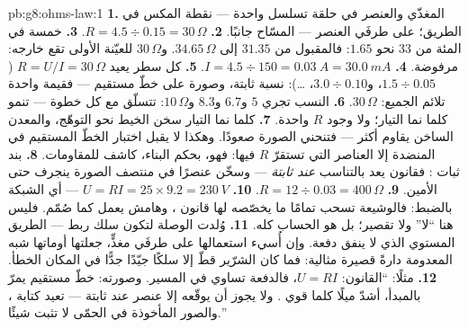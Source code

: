 \begin{solution}{pb:g8:ohms-law:1}
\textbf{1.} المغذّي  والعنصر في حلقة تسلسل واحدة
--- نقطة المكس في الطريق؛  على طرفَي العنصر ---
المسّاح جانبًا.
\textbf{2.} $R = 4.5 \div 0.15 = 30\,\Omega$.
\textbf{3.} خمسة في المئة من $33$ نحو $1.65$: فالمقبول من
$31.35$ إلى $34.65\,\Omega$. و$30\,\Omega$ للعيّنة الأولى تقع
خارجه: مرفوضة.
\textbf{4.} $I = 4.5 \div 150 = \qty{0.03}{A} =
\qty{30.0}{mA}$.
\textbf{5.} كل سطر يعيد $R = U/I = 30\,\Omega$ ($1.5 \div
0.05$، و$3.0 \div 0.10$، \dots): نسبة ثابتة، وصورة على خطّ
مستقيم --- فقيمة واحدة تلائم الجميع: $30\,\Omega$.
\textbf{6.} النسب تجري $5$ و$6.7$ و$8.3$ و$10\,\Omega$:
تتسلّق مع كل خطوة ---  تنمو كلما نما التيار؛ ولا وجود
 $R$ واحدة.
\textbf{7.} كلما نما التيار سخن الخيط نحو التوهّج، والمعدن
الساخن يقاوم أكثر --- فتنحني الصورة صعودًا. وهكذا لا يقبل
اختبار الخطّ المستقيم في المنضدة إلا العناصر التي تستقرّ
$R$ فيها: فهو، بحكم البناء، كاشف للمقاومات.
\textbf{8.} بند ثبات : فقانون  يعد بالتناسب
\emph{عند  ثابتة} --- وسخّن عنصرًا في منتصف الصورة
ينجرف حتى  الأمين.
\textbf{9.} $R = 12 \div 0.03 = 400\,\Omega$.
\textbf{10.} $U = R I = 25 \times 9.2 = \qty{230}{V}$ ---
أي الشبكة بالضبط: فالوشيعة تسحب تمامًا ما يخصّصه لها قانون
، وهامش  يعمل كما صُمّم. فليس هنا ``لا'' ولا
تقصير؛ بل هو الحساب كله.
\textbf{11.} وُلدت الوصلة لتكون سلك ربط --- الطريق المستوي
الذي لا ينفق دفعة. وإن أُسيء استعمالها على طرفَي مغذٍّ، جعلتها
أوماتها شبه المعدومة دارةً قصيرة مثالية: فما كان الشرّير قطّ
إلا سلكًا جيّدًا جدًّا في المكان الخطأ.
\textbf{12.} مثلًا: ``القانون: $U = R I$، فالدفعة تساوي
 في المسير. وصورته: خطّ مستقيم يمرّ بالمبدأ، أشدّ
ميلًا كلما قوي . ولا يجوز أن يوقّعه إلا عنصر عند  ثابتة ---  تعيد كتابة ، والصور المأخوذة
في الحمّى لا تثبت شيئًا.''
\end{solution}

